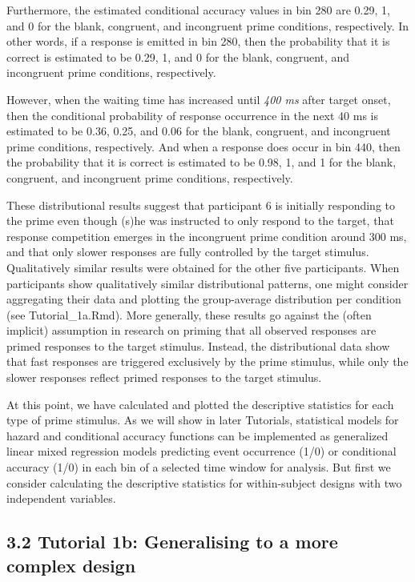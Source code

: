 \documentclass[
  english,
  man, donotrepeattitle,floatsintext]{apa6}
\begin{document}
Furthermore, the estimated conditional accuracy values in bin 280 are 0.29, 1, and 0 for the blank, congruent, and incongruent prime conditions, respectively. In other words, if a response is emitted in bin 280, then the probability that it is correct is estimated to be 0.29, 1, and 0 for the blank, congruent, and incongruent prime conditions, respectively.

However, when the waiting time has increased until \emph{400 ms} after target onset, then the conditional probability of response occurrence in the next 40 ms is estimated to be 0.36, 0.25, and 0.06 for the blank, congruent, and incongruent prime conditions, respectively. And when a response does occur in bin 440, then the probability that it is correct is estimated to be 0.98, 1, and 1 for the blank, congruent, and incongruent prime conditions, respectively.

These distributional results suggest that participant 6 is initially responding to the prime even though (s)he was instructed to only respond to the target, that response competition emerges in the incongruent prime condition around 300 ms, and that only slower responses are fully controlled by the target stimulus. Qualitatively similar results were obtained for the other five participants. When participants show qualitatively similar distributional patterns, one might consider aggregating their data and plotting the group-average distribution per condition (see Tutorial\_1a.Rmd). More generally, these results go against the (often implicit) assumption in research on priming that all observed responses are primed responses to the target stimulus. Instead, the distributional data show that fast responses are triggered exclusively by the prime stimulus, while only the slower responses reflect primed responses to the target stimulus.

At this point, we have calculated and plotted the descriptive statistics for each type of prime stimulus. As we will show in later Tutorials, statistical models for hazard and conditional accuracy functions can be implemented as generalized linear mixed regression models predicting event occurrence (1/0) or conditional accuracy (1/0) in each bin of a selected time window for analysis. But first we consider calculating the descriptive statistics for within-subject designs with two independent variables.

\subsection{3.2 Tutorial 1b: Generalising to a more complex design}\label{tutorial-1b-generalising-to-a-more-complex-design}
\end{document}
